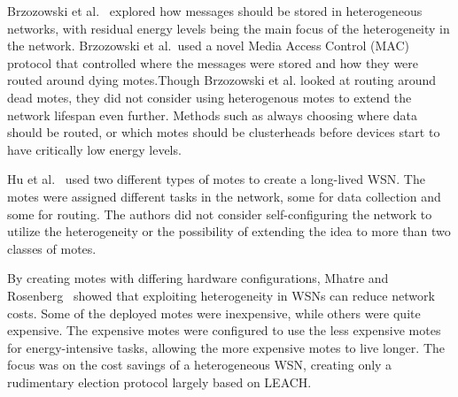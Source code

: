 Brzozowski et al.~\cite{completelydistributed} explored how messages should be 
stored in heterogeneous networks, with residual energy levels being the main 
focus of the heterogeneity in the network.
Brzozowski et al.\ used a novel Media Access Control  (MAC)  protocol that 
controlled where the messages were stored and how they were routed around dying 
motes.Though Brzozowski et al. looked at routing around dead motes, they did not
consider using heterogenous motes to  extend the network lifespan even further. 
Methods such as always choosing where data should be routed, or which 
motes should be clusterheads before devices start to have critically low 
energy levels.


Hu et al.~\cite{longlivedhybrid} used two different types of motes to create a 
long-lived WSN. The motes were assigned different tasks in the network, some 
for data collection and some for routing. The authors did not consider 
self-configuring the network to utilize the heterogeneity or the possibility 
of extending the idea to more than two classes of motes. 

By creating motes with differing hardware configurations, Mhatre and 
Rosenberg~\cite{comparativestudy} showed that exploiting heterogeneity in WSNs 
can reduce network costs.  
Some of the deployed motes were inexpensive, while others were quite 
expensive. The expensive motes were configured to use the less expensive motes 
for energy-intensive tasks, allowing the more expensive motes to live longer.  
The focus was on the cost savings of a heterogeneous WSN, creating only a 
rudimentary election protocol largely based on LEACH.


